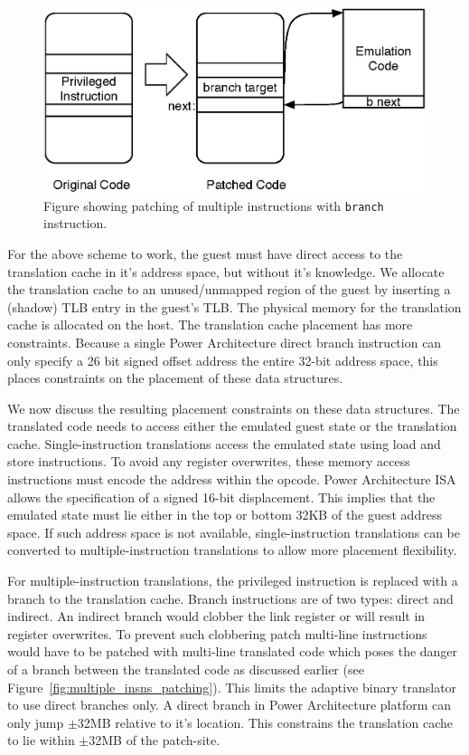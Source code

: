 \begin{figure}[!tb]
\centering
\includegraphics[scale=0.5]{txcache.eps}
\caption{\label{fig:txcache}Figure showing patching of multiple instructions with {\tt branch} instruction.}
\end{figure}

For the above scheme to work, the guest must have direct access to the translation cache in it's address space, but without it's knowledge.
We allocate the translation cache to an unused/unmapped region of the guest by inserting a (shadow) TLB entry in the guest's TLB. The physical memory for the translation cache is allocated on the host. The translation cache placement
has more constraints. Because a single Power Architecture direct branch
instruction can only specify a 26%
bit signed offset
address the entire 32-bit address space, this places constraints on the placement of these data structures.

We now discuss the resulting placement constraints on these data structures. The translated code needs to access either the emulated guest state or the translation cache.  Single-instruction translations access the emulated state using load and store instructions. To avoid any register overwrites, these memory access instructions must encode the address within the opcode. Power Architecture ISA allows the specification of a signed 16-bit displacement. This implies that the emulated state must lie either in the top or bottom 32KB of the guest address space. If such address space is not available, single-instruction translations can be converted to multiple-instruction translations to allow more placement flexibility.

For multiple-instruction translations, the privileged instruction is replaced with a branch to the translation cache. Branch instructions are of two types: direct and indirect. An indirect branch would clobber the link register or will result in register overwrites. To prevent such clobbering patch multi-line instructions would have to be patched with multi-line translated code which poses the danger of a branch between the translated code as discussed earlier (see Figure~\ref{fig:multiple_insns_patching}). This limits the adaptive binary translator to use direct branches only. A direct branch in Power Architecture platform can only jump $\pm$32MB relative to it's location. This constrains the translation cache to lie within $\pm$32MB of the patch-site.

